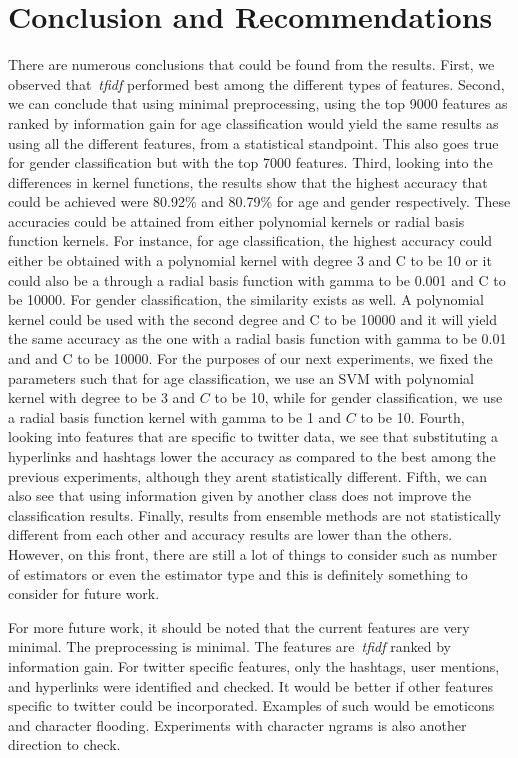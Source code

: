 \documentclass[a4paper]{llncs}
\begin{document}
\section{Conclusion and Recommendations}
There are numerous conclusions that could be found from the results. First, we observed that~\textit{tfidf} performed best among the different types of features. Second, we can conclude that using minimal preprocessing, using the top 9000 features as ranked by information gain for age classification would yield the same results as using all the different features, from a statistical standpoint. This also goes true for gender classification but with the top 7000 features. Third, looking into the differences in kernel functions, the results show that the highest accuracy that could be achieved were 80.92\% and 80.79\% for age and gender respectively. These accuracies could be attained from either polynomial kernels or radial basis function kernels. For instance, for age classification, the highest accuracy could either be obtained with a polynomial kernel with degree 3 and C to be 10 or it could also be a through a radial basis function with gamma to be 0.001 and C to be 10000. For gender classification, the similarity exists as well. A polynomial kernel could be used with the second degree and C to be 10000 and it will yield the same accuracy as the one with a radial basis function with gamma to be 0.01 and and C to be 10000. For the purposes of our next experiments, we fixed the parameters such that for age classification, we use an SVM with polynomial kernel with degree to be 3 and $C$ to be 10, while for gender classification, we use a radial basis function kernel with gamma to be 1 and $C$ to be 10. Fourth, looking into features that are specific to twitter data, we see that substituting a hyperlinks and hashtags lower the accuracy as compared to the best among the previous experiments, although they arent statistically different. Fifth, we can also see that using information given by another class does not improve the classification results. Finally, results from ensemble methods are not statistically different from each other and accuracy results are lower than the others. However, on this front, there are still a lot of things to consider such as number of estimators or even the estimator type and this is definitely something to consider for future work.  

For more future work, it should be noted that the current features are very minimal. The preprocessing is minimal. The features are~\textit{tfidf} ranked by information gain. For twitter specific features, only the hashtags, user mentions, and hyperlinks were identified and checked. It would be better if other features specific to twitter could be incorporated. Examples of such would be emoticons and character flooding. Experiments with character ngrams is also another direction to check. 




\end{document}
